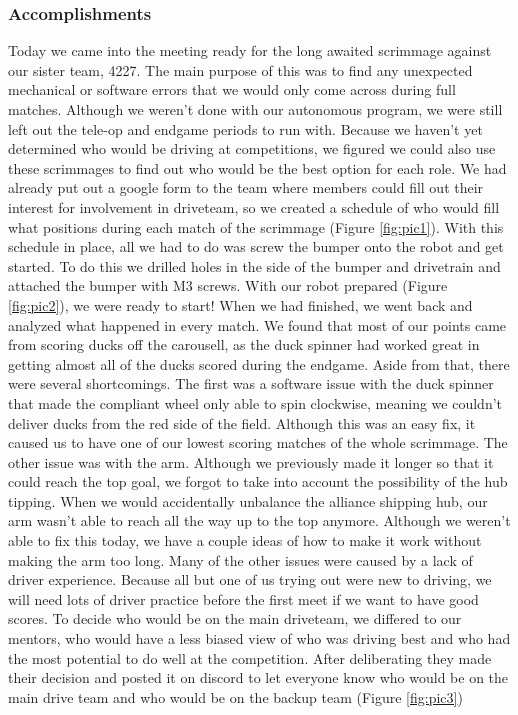 \subsubsection*{Accomplishments}
Today we came into the meeting ready for the long awaited scrimmage against our sister team, 4227. The main purpose of this was to find any unexpected mechanical or software errors that we would only come across during full matches. Although we weren’t done with our autonomous program, we were still left out the tele-op and endgame periods to run with. Because we haven’t yet determined who would be driving at competitions, we figured we could also use these scrimmages to find out who would be the best option for each role. We had already put out a google form to the team where members could fill out their interest for involvement in driveteam, so we created a schedule of who would fill what positions during each match of the scrimmage (Figure \ref{fig:pic1}). With this schedule in place, all we had to do was screw the bumper onto the robot and get started. To do this we drilled holes in the side of the bumper and drivetrain and attached the bumper with M3 screws. With our robot prepared (Figure \ref{fig:pic2}), we were ready to start!
When we had finished, we went back and analyzed what happened in every match. We found that most of our points came from scoring ducks off the carousell, as the duck spinner had worked great in getting almost all of the ducks scored during the endgame. Aside from that, there were several shortcomings. The first was a software issue with the duck spinner that made the compliant wheel only able to spin clockwise, meaning we couldn’t deliver ducks from the red side of the field. Although this was an easy fix, it caused us to have one of our lowest scoring matches of the whole scrimmage. The other issue was with the arm. Although we previously made it longer so that it could reach the top goal, we forgot to take into account the possibility of the hub tipping. When we would accidentally unbalance the alliance shipping hub, our arm wasn’t able to reach all the way up to the top anymore. Although we weren't able to fix this today, we have a couple ideas of how to make it work without making the arm too long. Many of the other issues were caused by a lack of driver experience. Because all but one of us trying out were new to driving, we will need lots of driver practice before the first meet if we want to have good scores. 
To decide who would be on the main driveteam, we differed to our mentors, who would have a less biased view of who was driving best and who had the most potential to do well at the competition. After deliberating they made their decision and posted it on discord to let everyone know who would be on the main drive team and who would be on the backup team (Figure \ref{fig:pic3})

